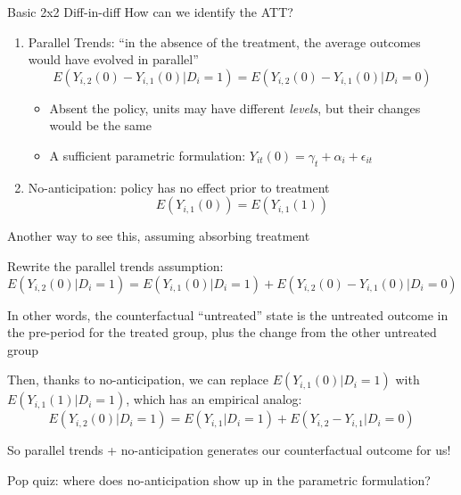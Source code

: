 \documentclass[notes,11pt, aspectratio=169]{beamer}
\newenvironment{wideitemize}{\itemize\addtolength{\itemsep}{10pt}}{\enditemize}
\begin{document}
\begin{frame}{Basic 2x2 Diff-in-diff}
	How can we identify the ATT?
	\begin{enumerate}
		\item Parallel Trends: ``in the absence of the treatment, the average outcomes would have evolved in parallel''
		      \begin{equation*}
			      E(Y_{i,2}(0) - Y_{i,1}(0) | D_{i} = 1) =     E(Y_{i,2}(0) - Y_{i,1}(0) | D_{i} = 0)
		      \end{equation*}
		      \begin{itemize}
			      \item Absent the policy, units may have different \emph{levels}, but their changes would be the same
			      \item A sufficient parametric formulation: $Y_{it}(0) = \gamma_{t} + \alpha_{i} + \epsilon_{it}$
		      \end{itemize}
		\item No-anticipation: policy has no effect prior to treatment
		      \begin{equation*}
			      E(Y_{i,1}(0)) = E(Y_{i,1}(1))
		      \end{equation*}
	\end{enumerate}
\end{frame}

\begin{frame}{Another way to see this, assuming absorbing treatment}
	\begin{wideitemize}
		\item Rewrite the parallel trends assumption:
		\begin{equation*}
			E(Y_{i,2}(0)| D_{i} = 1) =  E( Y_{i,1}(0) |D_{i} = 1) +   E(Y_{i,2}(0) - Y_{i,1}(0) | D_{i} = 0)
		\end{equation*}
		\item In other words, the counterfactual ``untreated'' state is
		the untreated outcome in the pre-period for the treated group,
		plus the change from the other untreated group
		\item Then, thanks to no-anticipation, we can replace
		$E( Y_{i,1}(0) |D_{i} = 1)$ with $E( Y_{i,1}(1) |D_{i} = 1)$,
		which has an empirical analog:
		\begin{equation*}
			E(Y_{i,2}(0)| D_{i} = 1) =  E( Y_{i,1} |D_{i} = 1) +   E(Y_{i,2} - Y_{i,1} | D_{i} = 0)
		\end{equation*}
		\item So parallel trends + no-anticipation generates our
		counterfactual outcome for us!
		\item Pop quiz: where does no-anticipation show up in the
		parametric formulation?
	\end{wideitemize}

\end{frame}
\end{document}
